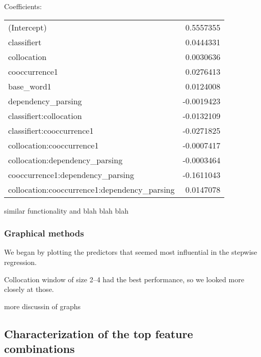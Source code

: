 \documentclass{article}
\begin{document}
Coefficients:
\begin{tabular}{l r}
                                (Intercept) & 0.5557355 \\
                                classifiert & 0.0444331  \\
                                 collocation & 0.0030636  \\
                              cooccurrence1 & 0.0276413 \\
                                 base_word1 & 0.0124008  \\
                         dependency_parsing & -0.0019423 \\
                     classifiert:collocation & -0.0132109 \\
                  classifiert:cooccurrence1 & -0.0271825 \\
                   collocation:cooccurrence1 & -0.0007417 \\
              collocation:dependency_parsing & -0.0003464 \\
           cooccurrence1:dependency_parsing & -0.1611043 \\
collocation:cooccurrence1:dependency_parsing & 0.0147078  \\
\end{tabular}


similar functionality and blah blah blah

\subsubsection{Graphical methods}
We began by plotting the predictors that seemed most influential in the
stepwise regression.


Collocation window of size 2--4 had the best performance, so we looked more closely at those.


more discussin of graphs


\subsection{Characterization of the top feature combinations}

\end{document}
